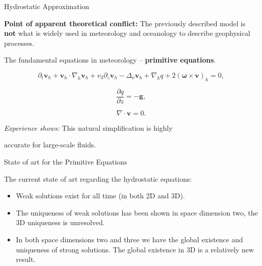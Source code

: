 \documentclass{beamer}
\begin{document}
\begin{frame}{Hydrostatic Approximation}

\textbf{Point of apparent theoretical conflict:} The previously described model is \textbf{not} what is widely used in meteorology and oceanology to describe geophysical processes.

The fundamental equations in meteorology -- \textbf{primitive equations}.

$$ \partial_t \mathbf{v}_h + \mathbf{v}_h \cdot \nabla_h \mathbf{v}_h + v_3 \partial_z \mathbf{v}_h - \Delta_{\nu} \mathbf{v}_h + \nabla_h q + 2 (\mathbf{\omega} \times \mathbf{v})_h = 0, $$

$$ \frac{\partial q}{\partial z} = - \mathbf{g}, $$

$$ \nabla \cdot \mathbf{v} = 0. $$

\begin{center}
\textit{Experience shows:} This natural simplification is highly

accurate for large-scale fluids. 
\end{center}

\end{frame}

\begin{frame}{State of art for the Primitive Equations}

The current state of art regarding the hydrostatic equations:

\begin{itemize}
\item Weak solutions exist for all time (in both 2D and 3D).
\item The uniqueness of weak solutions has been shown in space dimension two, the 3D uniqueness is unresolved.
\item In both space dimensions two and three we have the global existence and uniqueness of strong solutions. The global existence in 3D is a relatively new result.
\end{itemize}

\end{frame}
\end{document}
